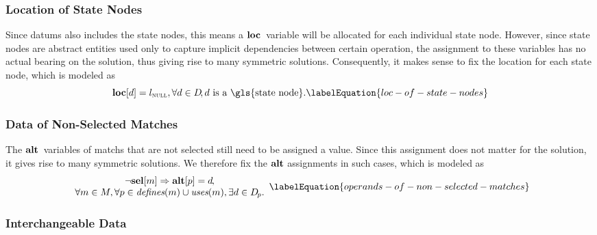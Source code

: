 

\subsubsection{Location of State Nodes}

Since \glspl{datum} also includes the \glspl{state node}, this means a
$\mVar{loc}$~\gls{variable} will be allocated for each individual \gls{state
  node}.
%
However, since \glspl{state node} are abstract entities used only to capture
implicit dependencies between certain \gls{operation}, the assignment to these
\glspl{variable} has no actual bearing on the \gls{solution}, thus giving rise
to many symmetric \glspl{solution}.
%
Consequently, it makes sense to fix the location for each \gls{state node},
which is modeled as
%
\begin{equation}
  \mVar{loc}[d] = \mNullLocation,
  \forall d \in \mDataSet\!, \text{$d$ is a \gls{state node}}.
  \labelEquation{loc-of-state-nodes}
\end{equation}


\subsubsection{Data of Non-Selected Matches}

The $\mVar{alt}$~\glspl{variable} of \glspl{match} that are not selected still
need to be assigned a value.
%
Since this assignment does not matter for the \gls{solution}, it gives rise to
many symmetric \glspl{solution}.
%
We therefore fix the $\mVar{alt}$ assignments in such cases, which is modeled as
%
\begin{equation}
  \begin{array}{c}
    \neg\mVar{sel}[m] \mImp \mVar{alt}[p] = d\hspace{-1pt}, \\
    \forall m \in \mMatchSet,
    \forall p \in \mDefines(m) \cup \mUses(m),
    \exists d \in \mDataSet[\hspace{-1pt}p].
  \end{array}
  \labelEquation{operands-of-non-selected-matches}
\end{equation}


\subsubsection{Interchangeable Data}


